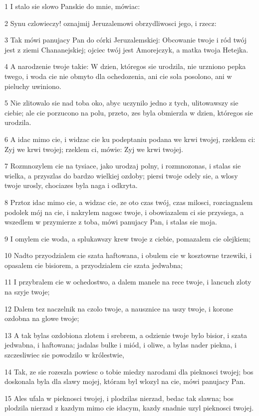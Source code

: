 \par 1 I stalo sie slowo Panskie do mnie, mówiac:
\par 2 Synu czlowieczy! oznajmij Jeruzalemowi obrzydliwosci jego, i rzecz:
\par 3 Tak mówi panujacy Pan do córki Jeruzalemskiej: Obcowanie twoje i ród twój jest z ziemi Chananejskiej; ojciec twój jest Amorejczyk, a matka twoja Hetejka.
\par 4 A narodzenie twoje takie: W dzien, któregos sie urodzila, nie urzniono pepka twego, i woda cie nie obmyto dla ochedozenia, ani cie sola posolono, ani w pieluchy uwiniono.
\par 5 Nie zlitowalo sie nad toba oko, abyc uczynilo jedno z tych, ulitowawszy sie ciebie; ale cie porzucono na polu, przeto, zes byla obmierzla w dzien, któregos sie urodzila.
\par 6 A idac mimo cie, i widzac cie ku podeptaniu podana we krwi twojej, rzeklem ci: Zyj we krwi twojej; rzeklem ci, mówie: Zyj we krwi twojej.
\par 7 Rozmnozylem cie na tysiace, jako urodzaj polny, i rozmnozonas, i stalas sie wielka, a przyszlas do bardzo wielkiej ozdoby; piersi twoje odely sie, a wlosy twoje urosly, chociazes byla naga i odkryta.
\par 8 Prztoz idac mimo cie, a widzac cie, ze oto czas twój, czas milosci, rozciagnalem podolek mój na cie, i nakrylem nagosc twoje, i obowiazalem ci sie przysiega, a wszedlem w przymierze z toba, mówi panujacy Pan, i stalas sie moja.
\par 9 I omylem cie woda, a splukawszy krew twoje z ciebie, pomazalem cie olejkiem;
\par 10 Nadto przyodzialem cie szata haftowana, i obulem cie w kosztowne trzewiki, i opasalem cie bisiorem, a przyodzialem cie szata jedwabna;
\par 11 I przybralem cie w ochedostwo, a dalem manele na rece twoje, i lancuch zloty na szyje twoje;
\par 12 Dalem tez naczelnik na czolo twoje, a nausznice na uszy twoje, i korone ozdobna na glowe twoje;
\par 13 A tak bylas ozdobiona zlotem i srebrem, a odzienie twoje bylo bisior, i szata jedwabna, i haftowana; jadalas bulke i miód, i oliwe, a bylas nader piekna, i szczesliwiec sie powodzilo w królestwie,
\par 14 Tak, ze sie rozeszla powiesc o tobie miedzy narodami dla pieknosci twojej; bos doskonala byla dla slawy mojej, któram byl wlozyl na cie, mówi panujacy Pan.
\par 15 Ales ufala w pieknosci twojej, i plodzilas nierzad, bedac tak slawna; bos plodzila nierzad z kazdym mimo cie idacym, kazdy snadnie uzyl pieknosci twojej.
